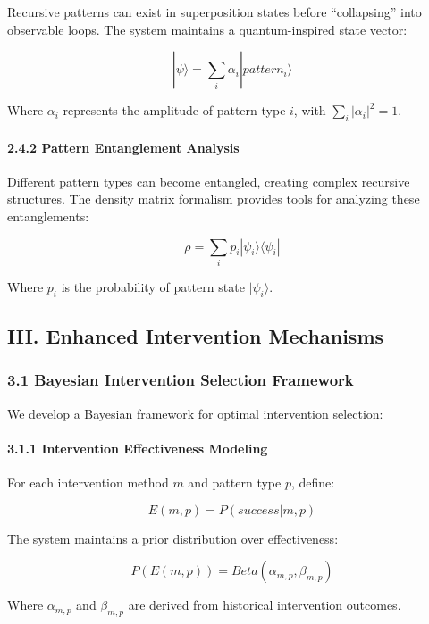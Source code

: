 \documentclass[
]{article}
\begin{document}
Recursive patterns can exist in superposition states before
``collapsing'' into observable loops. The system maintains a
quantum-inspired state vector:

\[|\psi\rangle = \sum_{i} \alpha_i |pattern_i\rangle\]

Where \(\alpha_i\) represents the amplitude of pattern type \(i\), with
\(\sum_i |\alpha_i|^2 = 1\).

\paragraph{2.4.2 Pattern Entanglement
Analysis}\label{pattern-entanglement-analysis}

Different pattern types can become entangled, creating complex recursive
structures. The density matrix formalism provides tools for analyzing
these entanglements:

\[\rho = \sum_i p_i |\psi_i\rangle\langle\psi_i|\]

Where \(p_i\) is the probability of pattern state \(|\psi_i\rangle\).

\subsection{III. Enhanced Intervention
Mechanisms}\label{iii.-enhanced-intervention-mechanisms}

\subsubsection{3.1 Bayesian Intervention Selection
Framework}\label{bayesian-intervention-selection-framework}

We develop a Bayesian framework for optimal intervention selection:

\paragraph{3.1.1 Intervention Effectiveness
Modeling}\label{intervention-effectiveness-modeling}

For each intervention method \(m\) and pattern type \(p\), define:

\[E(m, p) = P(success | m, p)\]

The system maintains a prior distribution over effectiveness:

\[P(E(m, p)) = Beta(\alpha_{m,p}, \beta_{m,p})\]

Where \(\alpha_{m,p}\) and \(\beta_{m,p}\) are derived from historical
intervention outcomes.
\end{document}

